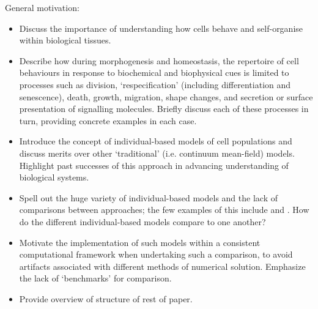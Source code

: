 \documentclass{article}
\begin{document}
General motivation:
\begin{itemize}
\item Discuss the importance of understanding how cells behave and self-organise within biological tissues.
\item Describe how during morphogenesis and homeostasis, the repertoire of cell behaviours in response to biochemical and biophysical cues is limited to processes such as division, `respecification' (including differentiation and senescence), death, growth, migration, shape changes, and secretion or surface presentation of signalling molecules. Briefly discuss each of these processes in turn, providing concrete examples in each case.
\item Introduce the concept of individual-based models of cell populations and discuss merits over other `traditional' (i.e. continuum mean-field) models. Highlight past successes of this approach in advancing understanding of biological systems.
\item Spell out the huge variety of individual-based models and the lack of comparisons between approaches; the few examples of this include \citet{Galle2006Individual} and \citet{Osborne2010Hybrid}. How do the different individual-based models compare to one another?
\item Motivate the implementation of such models within a consistent computational framework when undertaking such a comparison, to avoid artifacts associated with different methods of numerical solution. Emphasize the lack of `benchmarks' for comparison.
\item Provide overview of structure of rest of paper.
\end{itemize}

\end{document}
